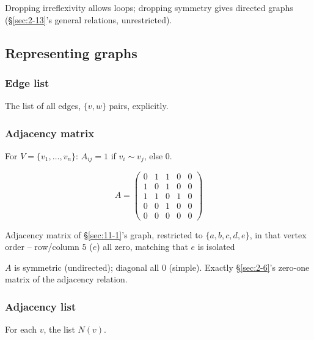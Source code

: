 \documentclass[11pt]{article}
\begin{document}
\begin{note}
Dropping irreflexivity allows loops; dropping symmetry gives directed graphs (\S\ref{sec:2-13}'s general relations, unrestricted).
\end{note}

\subsection{Representing graphs}
\label{sec:11-4}

\subsubsection{Edge list}
\begin{definition}
The list of all edges, $\{v,w\}$ pairs, explicitly.
\end{definition}

\subsubsection{Adjacency matrix}
\begin{definition}
For $V=\{v_1,\dots,v_n\}$: $A_{ij}=1$ if $v_i\sim v_j$, else $0$.
\end{definition}

\[
A =
\begin{pmatrix}
0 & 1 & 1 & 0 & 0 \\
1 & 0 & 1 & 0 & 0 \\
1 & 1 & 0 & 1 & 0 \\
0 & 0 & 1 & 0 & 0 \\
0 & 0 & 0 & 0 & 0
\end{pmatrix}
\]

\begin{center}
\small Adjacency matrix of \S\ref{sec:11-1}'s graph, restricted to $\{a,b,c,d,e\}$, in that vertex order -- row/column $5$ ($e$) all zero, matching that $e$ is isolated
\end{center}

\begin{note}
$A$ is symmetric (undirected); diagonal all $0$ (simple). Exactly \S\ref{sec:2-6}'s zero-one matrix of the adjacency relation.
\end{note}

\subsubsection{Adjacency list}
\begin{definition}
For each $v$, the list $N(v)$.
\end{definition}
\end{document}
